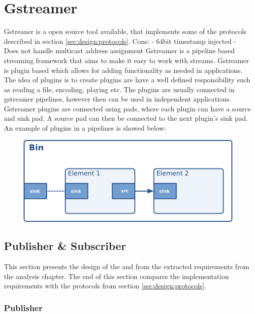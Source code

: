 \section{Gstreamer}
Gstreaner is a open source tool available, that implements some of the protocols described in section \ref{sec:design:protocols}.
Cons:
 - 64bit timestamp injected
 - Does not handle multicast address assignment
Gstreamer is a pipeline based streaming framework that aims to make it easy to work with streams. Gstreamer is plugin based which allows for adding functionality as needed in applications. The idea of plugins is to create plugins are have a well defined responsibility such as reading a file, encoding, playing etc. The plugins are usually connected in gstreamer pipelines, however then can be used in independent applications. Gstreamer plugins are connected using pads, where each plugin can have a source and sink pad. A source pad can then be connected to the next plugin's sink pad. An example of plugins in a pipelines is showed below:
\begin{figure}
	\includegraphics[width=1\textwidth]{figures/bin-element-ghost.png}
\end{figure}





\subsection{Publisher \& Subscriber}
This section presents the design of the  and  from the extracted requirements from the analysis chapter. The end of this section compares the implementation requirements with the protocols from section \ref{sec:design:protocols}.

\subsubsection{Publisher}

